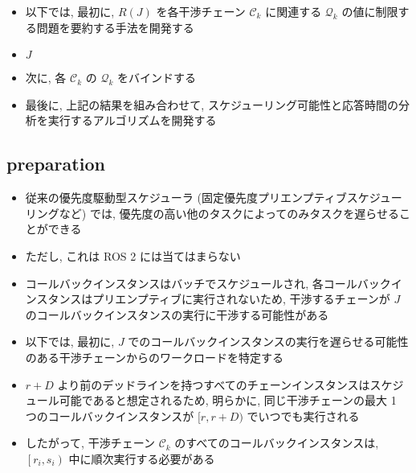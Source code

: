 \begin{frame}{}
    \begin{itemize}
        \item 以下では, 最初に, $R(J)$ を各干渉チェーン $\mathcal{C}_{k}$ に関連する $\mathcal{Q}_{k}$ の値に制限する問題を要約する手法を開発する
        \item $J$
        \item 次に, 各 $\mathcal{C}_{k}$ の $\mathcal{Q}_{k}$ をバインドする
        \item 最後に, 上記の結果を組み合わせて, スケジューリング可能性と応答時間の分析を実行するアルゴリズムを開発する
    \end{itemize}
\end{frame}


\subsection{preparation}
\label{ssec: preparation}

\begin{frame}{}
    \begin{itemize}
        \item 従来の優先度駆動型スケジューラ (固定優先度プリエンプティブスケジューリングなど) では, 優先度の高い他のタスクによってのみタスクを遅らせることができる
        \item ただし, これは ROS 2 には当てはまらない
        \item コールバックインスタンスはバッチでスケジュールされ, 各コールバックインスタンスはプリエンプティブに実行されないため, 干渉するチェーンが $J$ のコールバックインスタンスの実行に干渉する可能性がある
        \item 以下では, 最初に, $J$ でのコールバックインスタンスの実行を遅らせる可能性のある干渉チェーンからのワークロードを特定する
    \end{itemize}
\end{frame}

\begin{frame}{}
    \begin{itemize}
        \item  $r+D$ より前のデッドラインを持つすべてのチェーンインスタンスはスケジュール可能であると想定されるため, 明らかに, 同じ干渉チェーンの最大 1 つのコールバックインスタンスが $[r, r+D)$ でいつでも実行される
        \item したがって, 干渉チェーン $\mathcal{C}_{k}$ のすべてのコールバックインスタンスは, $\left[r_{i}, s_{i}\right)$ 中に順次実行する必要がある
    \end{itemize}
\end{frame}

